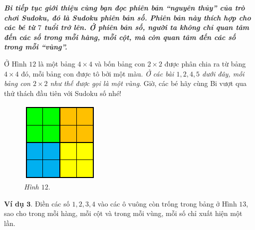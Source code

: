 	\graphicspath{{../suyluancungbi/sudoku2/}}
	\vskip 0.2cm
	\textit{\textbf{Bi tiếp tục giới thiệu cùng bạn đọc phiên bản “nguyên thủy” của trò chơi Sudoku, đó là Sudoku phiên bản số. Phiên bản này thích hợp cho các bé từ $7$ tuổi trở lên.
	Ở phiên bản số, người ta không chỉ quan tâm đến các số trong mỗi hàng, mỗi cột, mà còn quan tâm đến các số trong mỗi “vùng”.}}
	\begin{multicols}{2}
		Ở Hình $12$ là một bảng $4\times4$ và bốn bảng con $2\times2$ được phân chia ra từ bảng $4\times4$ đó, mỗi bảng con được tô bởi một màu. \textit{Ở các bài $1, 2, 4, 5$ dưới đây, mỗi bảng con $2\times2$ như thế được gọi là một vùng}.
		\vskip 0.1cm
		Giờ, các bé hãy cùng Bi vượt qua thử thách đầu tiên với Sudoku  số nhé!
		\begin{figure}[H]
			\centering
			\vspace*{5pt}
			\captionsetup{labelformat= empty, justification=centering}
			\includegraphics[scale=1]{pic1}
			\caption{\small\textit{Hình $12.$}}
			\vspace*{-10pt}
		\end{figure}
	\end{multicols}
		\textbf{Ví dụ $\pmb{3.}$} Điền các số $1, 2, 3, 4$ vào các ô vuông còn trống trong bảng ở Hình $13$, sao cho trong mỗi hàng, mỗi cột và trong mỗi vùng, mỗi số chỉ xuất hiện một lần.
	
